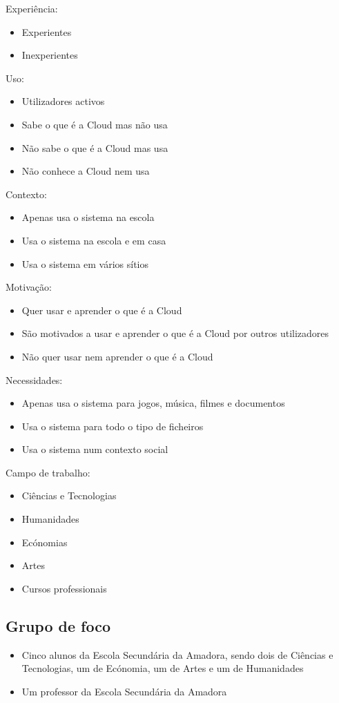 Experiência:
\begin{itemize}
	\item Experientes
	\item Inexperientes
\end{itemize}
Uso:
\begin{itemize}
	\item Utilizadores activos
	\item Sabe o que é a Cloud mas não usa
	\item Não sabe o que é a Cloud mas usa
	\item Não conhece a Cloud nem usa
\end{itemize}
Contexto:
\begin{itemize}
	\item Apenas usa o sistema na escola
	\item Usa o sistema na escola e em casa
	\item Usa o sistema em vários sítios
\end{itemize}
Motivação:
\begin{itemize}
	\item Quer usar e aprender o que é a Cloud
	\item São motivados a usar e aprender o que é a Cloud por outros utilizadores
	\item Não quer usar nem aprender o que é a Cloud
\end{itemize}
Necessidades:
\begin{itemize}
	\item Apenas usa o sistema para jogos, música, filmes e documentos
	\item Usa o sistema para todo o tipo de ficheiros
	\item Usa o sistema num contexto social
\end{itemize}
Campo de trabalho:
\begin{itemize}
	\item Ciências e Tecnologias
	\item Humanidades
	\item Ecónomias
	\item Artes
	\item Cursos professionais
\end{itemize}

\subsection{Grupo de foco}
\begin{itemize}
	\item Cinco alunos da Escola Secundária da Amadora, sendo dois de Ciências e Tecnologias, um de Ecónomia, um de Artes e um de Humanidades
	\item Um professor da Escola Secundária da Amadora
\end{itemize}
